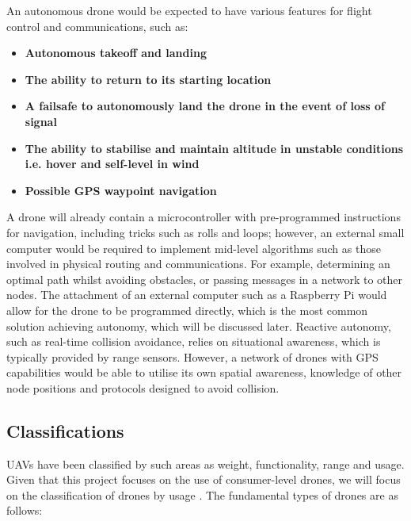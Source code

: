 An autonomous drone would be expected to have various features for flight control and communications, such as:
\begin{itemize}
\item \textbf{Autonomous takeoff and landing}
\item \textbf{The ability to return to its starting location}
\item \textbf{A failsafe to autonomously land the drone in the event of loss of signal}
\item \textbf{The ability to stabilise and maintain altitude in unstable conditions i.e. hover and self-level in wind}
\item \textbf{Possible GPS waypoint navigation}
\end{itemize}
A drone will already contain a microcontroller with pre-programmed instructions for navigation, including tricks such as rolls and loops; however, an external small computer would be required to implement mid-level algorithms such as those involved in physical routing and communications. For example, determining an optimal path whilst avoiding obstacles, or passing messages in a network to other nodes. The attachment of an external computer such as a Raspberry Pi would allow for the drone to be programmed directly, which is the most common solution achieving autonomy, which will be discussed later.
Reactive autonomy, such as real-time collision avoidance, relies on situational awareness, which is typically provided by range sensors. However, a network of drones with GPS capabilities would be able to utilise its own spatial awareness, knowledge of other node positions and protocols designed to avoid collision. 

\subsection{Classifications}
UAVs have been classified by such areas as weight, functionality, range and usage. Given that this project focuses on the use of consumer-level drones, we will focus on the classification of drones by usage \cite{yashgarg2015}. The fundamental types of drones are as follows:

